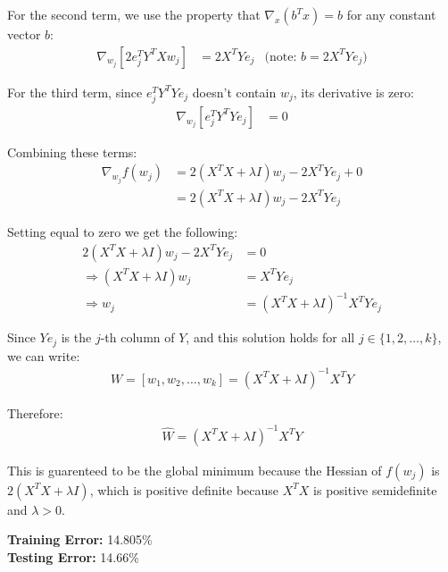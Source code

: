 \documentclass{article}
\begin{document}
\begin{aprob}
\begin{tcolorbox}[colback=lightgray!10!white, colframe=black, title=A5.a, breakable]
        For the second term, we use the property that $\nabla_x(b^Tx) = b$ for any constant vector $b$:
        \begin{align*}
        \nabla_{w_j}[2e_j^T Y^T X w_j] &= 2X^T Y e_j & \text{(note: $b = 2X^T Y e_j$)}
        \end{align*}
        
        For the third term, since $e_j^T Y^T Y e_j$ doesn't contain $w_j$, its derivative is zero:
        \begin{align*}
        \nabla_{w_j}[e_j^T Y^T Y e_j] &= 0
        \end{align*}
        
        Combining these terms:
        \begin{align*}
        \nabla_{w_j} f(w_j) &= 2(X^T X + \lambda I)w_j - 2X^T Y e_j + 0 \\
        &= 2(X^T X + \lambda I)w_j - 2X^T Y e_j
        \end{align*}
        
        Setting equal to zero we get the following:
        \begin{align*}
        2(X^T X + \lambda I)w_j - 2X^T Y e_j &= 0 \\
        \Rightarrow (X^T X + \lambda I)w_j &= X^T Y e_j \\
        \Rightarrow w_j &= (X^T X + \lambda I)^{-1} X^T Y e_j
        \end{align*}
         
        Since $Y e_j$ is the $j$-th column of $Y$, and this solution holds for all $j \in \{1, 2, \ldots, k\}$, we can write:
        \begin{align*}
        W = [w_1, w_2, \ldots, w_k] = (X^T X + \lambda I)^{-1} X^T Y
        \end{align*}
        
        Therefore:
        \begin{align*}
        \widehat{W} = (X^T X + \lambda I)^{-1} X^T Y
        \end{align*}
        
        This is guarenteed to be the global minimum because the Hessian of $f(w_j)$ is $2(X^T X + \lambda I)$, which is positive definite because $X^T X$ is positive semidefinite and $\lambda > 0$. \\
        \end{tcolorbox}
        \begin{tcolorbox}[colback=lightgray!10!white, colframe=black, title=A5.b, breakable]
            \textbf{Training Error:} 14.805\% \\
            \textbf{Testing Error:} 14.66\%
        \end{tcolorbox}
\end{aprob}
\end{document}
